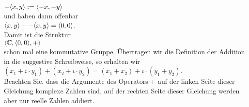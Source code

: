 \\[0.2cm]
\hspace*{1.3cm}
$-\pair(x,y) := \pair(-x,-y)$
\\[0.2cm]
und haben dann offenbar
\\[0.2cm]
\hspace*{1.3cm}
$\pair(x, y) + -\pair(x,y) = \pair(0,0)$.
\\[0.2cm]
Damit ist die Struktur
\\[0.2cm]
\hspace*{1.3cm}
$\langle \mathbb{C}, \pair(0,0), + \rangle$
\\[0.2cm]
schon mal eine kommutative Gruppe.
Übertragen wir die Definition der Addition in die suggestive Schreibweise, so erhalten wir
\\[0.2cm]
\hspace*{1.3cm}
$(x_1 + i \cdot y_1) + (x_2 + i \cdot y_2) = (x_1 + x_2) + i \cdot (y_1 + y_2)$.
\\[0.2cm]
Beachten Sie, dass die Argumente des Operators $+$ auf der linken Seite dieser Gleichung
komplexe Zahlen sind, auf der rechten Seite dieser Gleichung werden aber nur reelle Zahlen
addiert.  

